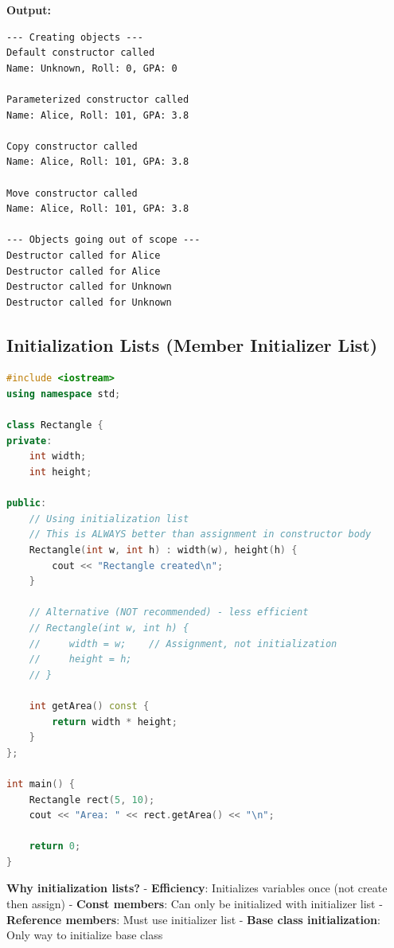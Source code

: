 \textbf{Output:}

\begin{lstlisting}
--- Creating objects ---
Default constructor called
Name: Unknown, Roll: 0, GPA: 0

Parameterized constructor called
Name: Alice, Roll: 101, GPA: 3.8

Copy constructor called
Name: Alice, Roll: 101, GPA: 3.8

Move constructor called
Name: Alice, Roll: 101, GPA: 3.8

--- Objects going out of scope ---
Destructor called for Alice
Destructor called for Alice
Destructor called for Unknown
Destructor called for Unknown
\end{lstlisting}

\hypertarget{initialization-lists-member-initializer-list}{%
\subsection{Initialization Lists (Member Initializer
List)}\label{initialization-lists-member-initializer-list}}

\begin{lstlisting}[language={C++}]
#include <iostream>
using namespace std;

class Rectangle {
private:
    int width;
    int height;

public:
    // Using initialization list
    // This is ALWAYS better than assignment in constructor body
    Rectangle(int w, int h) : width(w), height(h) {
        cout << "Rectangle created\n";
    }
    
    // Alternative (NOT recommended) - less efficient
    // Rectangle(int w, int h) {
    //     width = w;    // Assignment, not initialization
    //     height = h;
    // }
    
    int getArea() const {
        return width * height;
    }
};

int main() {
    Rectangle rect(5, 10);
    cout << "Area: " << rect.getArea() << "\n";
    
    return 0;
}
\end{lstlisting}

\textbf{Why initialization lists?} - \textbf{Efficiency}: Initializes
variables once (not create then assign) - \textbf{Const members}: Can
only be initialized with initializer list - \textbf{Reference members}:
Must use initializer list - \textbf{Base class initialization}: Only way
to initialize base class

